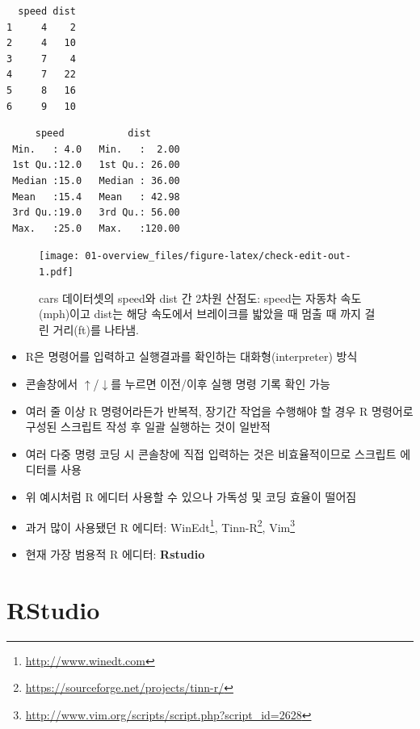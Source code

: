 \documentclass[
  11pt,
]{krantz}
\providecommand{\tightlist}{%
  \setlength{\itemsep}{0pt}\setlength{\parskip}{0pt}}
\renewcommand{\href}[2]{#2\footnote{\url{#1}}}
\begin{document}
\footnotesize

\begin{verbatim}
  speed dist
1     4    2
2     4   10
3     7    4
4     7   22
5     8   16
6     9   10
\end{verbatim}

\begin{verbatim}
     speed           dist       
 Min.   : 4.0   Min.   :  2.00  
 1st Qu.:12.0   1st Qu.: 26.00  
 Median :15.0   Median : 36.00  
 Mean   :15.4   Mean   : 42.98  
 3rd Qu.:19.0   3rd Qu.: 56.00  
 Max.   :25.0   Max.   :120.00  
\end{verbatim}

\begin{figure}
\centering
\texttt{[image: 01-overview\_files/figure-latex/check-edit-out-1.pdf]}
\caption{\label{fig:check-edit-out}cars 데이터셋의 speed와 dist 간 2차원 산점도: speed는 자동차 속도(mph)이고 dist는 해당 속도에서 브레이크를 밟았을 때 멈출 때 까지 걸린 거리(ft)를 나타냄.}
\end{figure}

\normalsize

\begin{itemize}
\tightlist
\item
  R은 명령어를 입력하고 실행결과를 확인하는 대화형(interpreter) 방식
\item
  콘솔창에서 \(\uparrow\)/\(\downarrow\)를 누르면 이전/이후 실행 명령 기록 확인 가능
\item
  여러 줄 이상 R 명령어라든가 반복적, 장기간 작업을 수행해야 할 경우 R 명령어로 구성된 스크립트 작성 후 일괄 실행하는 것이 일반적
\item
  여러 다중 명령 코딩 시 콘솔창에 직접 입력하는 것은 비효율적이므로 스크립트 에디터를 사용
\item
  위 예시처럼 R 에디터 사용할 수 있으나 가독성 및 코딩 효율이 떨어짐
\item
  과거 많이 사용됐던 R 에디터: \href{http://www.winedt.com}{WinEdt}, \href{https://sourceforge.net/projects/tinn-r/}{Tinn-R}, \href{http://www.vim.org/scripts/script.php?script_id=2628}{Vim}
\item
  현재 가장 범용적 R 에디터: \textbf{Rstudio}
\end{itemize}

\hypertarget{r-studio}{%
\section{RStudio}\label{r-studio}}
\end{document}
